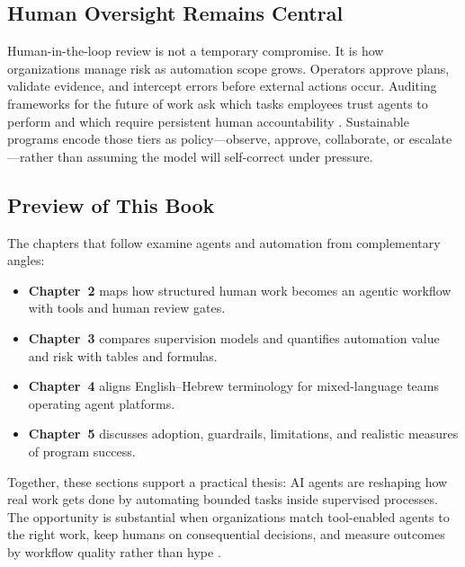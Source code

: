 \subsection{Human Oversight Remains Central}

Human-in-the-loop review is not a temporary compromise. It is how organizations manage
risk as automation scope grows. Operators approve plans, validate evidence, and intercept
errors before external actions occur. Auditing frameworks for the future of work ask which
tasks employees trust agents to perform and which require persistent human accountability
\cite{arxiv2506workagents}. Sustainable programs encode those tiers as policy---observe,
approve, collaborate, or escalate---rather than assuming the model will self-correct under
pressure.

\subsection{Preview of This Book}

The chapters that follow examine agents and automation from complementary angles:
\begin{itemize}
  \item \textbf{Chapter~2} maps how structured human work becomes an agentic workflow with
    tools and human review gates.
  \item \textbf{Chapter~3} compares supervision models and quantifies automation value and
    risk with tables and formulas.
  \item \textbf{Chapter~4} aligns English--Hebrew terminology for mixed-language teams
    operating agent platforms.
  \item \textbf{Chapter~5} discusses adoption, guardrails, limitations, and realistic
    measures of program success.
\end{itemize}

Together, these sections support a practical thesis: AI agents are reshaping how real work
gets done by automating bounded tasks inside supervised processes. The opportunity is
substantial when organizations match tool-enabled agents to the right work, keep humans on
consequential decisions, and measure outcomes by workflow quality rather than hype
\cite{mediumworkflowagents,recomaijobroles}.
